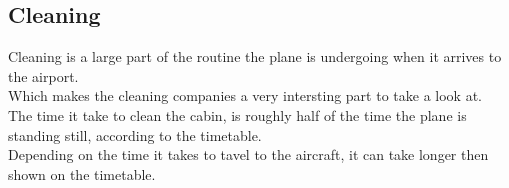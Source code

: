 \subsection{Cleaning}
Cleaning is a large part of the routine the plane is undergoing when it arrives to the airport.\\
Which makes the cleaning companies a very intersting part to take a look at.\\
The time it take to clean the cabin, is roughly half of the time the plane is standing still, according to the timetable.\\
Depending on the time it takes to tavel to the aircraft, it can take longer then shown on the timetable.\\


